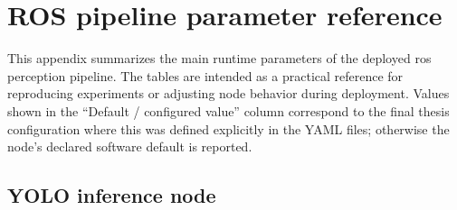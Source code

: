 \chapter{ROS pipeline parameter reference}
\label{app:ros2_params}

This appendix summarizes the main runtime parameters of the deployed
\gls{ros} perception pipeline. The tables are intended as a practical reference
for reproducing experiments or adjusting node behavior during deployment. Values
shown in the ``Default / configured value'' column correspond to the final thesis
configuration where this was defined explicitly in the YAML files; otherwise the
node's declared software default is reported.

\newcommand{\codepath}[1]{\path{#1}}

\section{YOLO inference node}

